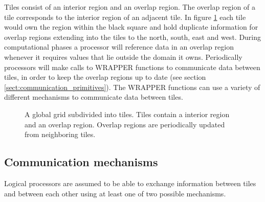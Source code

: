 Tiles consist of an interior region and an overlap region.  The
overlap region of a tile corresponds to the interior region of an
adjacent tile.  In figure \ref{fig:tiledworld} each tile would own the
region within the black square and hold duplicate information for
overlap regions extending into the tiles to the north, south, east and
west.  During computational phases a processor will reference data in
an overlap region whenever it requires values that lie outside the
domain it owns.  Periodically processors will make calls to WRAPPER
functions to communicate data between tiles, in order to keep the
overlap regions up to date (see section
\ref{sect:communication_primitives}).  The WRAPPER functions can use a
variety of different mechanisms to communicate data between tiles.

\begin{figure}
\begin{center}
\end{center}
\caption{ A global grid subdivided into tiles.
Tiles contain a interior region and an overlap region.
Overlap regions are periodically updated from neighboring tiles.
} \label{fig:tiledworld} 
\end{figure}

\subsection{Communication mechanisms}

Logical processors are assumed to be able to exchange information
between tiles and between each other using at least one of two
possible mechanisms.


